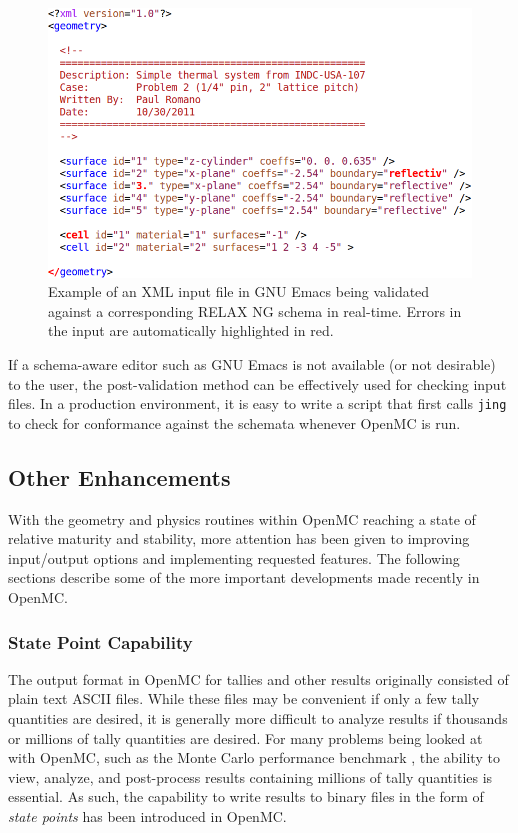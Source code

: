 \documentclass{ansconf}
\begin{document}
\begin{figure}[!htb]
  \centering
  \includegraphics[width=5.0in]{relaxng.png}
  \caption{Example of an XML input file in GNU Emacs being validated against a
    corresponding RELAX NG schema in real-time. Errors in the input are
    automatically highlighted in red.}
  \label{fig:relaxng}
\end{figure}

If a schema-aware editor such as GNU Emacs is not available (or not desirable)
to the user, the post-validation method can be effectively used for checking
input files. In a production environment, it is easy to write a script that
first calls \texttt{jing} to check for conformance against the schemata whenever
OpenMC is run.

\subsection{Other Enhancements}

With the geometry and physics routines within OpenMC reaching a state of
relative maturity and stability, more attention has been given to improving
input/output options and implementing requested features. The following sections
describe some of the more important developments made recently in OpenMC.

\subsubsection{State Point Capability}

The output format in OpenMC for tallies and other results originally consisted
of plain text ASCII files. While these files may be convenient if only a few
tally quantities are desired, it is generally more difficult to analyze results
if thousands or millions of tally quantities are desired. For many problems
being looked at with OpenMC, such as the Monte Carlo performance benchmark
\cite{mc-hoogenboom-2011}, the ability to view, analyze, and post-process
results containing millions of tally quantities is essential. As such, the
capability to write results to binary files in the form of \emph{state points}
has been introduced in OpenMC.
\end{document}
